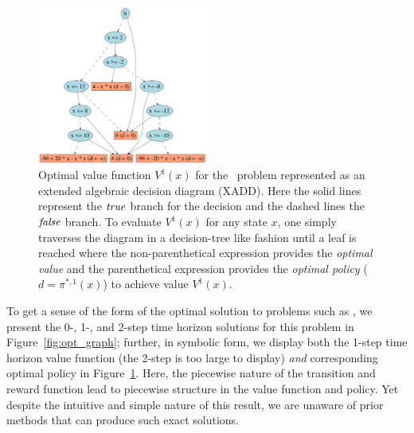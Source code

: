 \begin{figure}[t!]
\centering
\includegraphics[width=0.5\textwidth]{Figures1/v2_mr_dd.pdf}
\caption{\footnotesize Optimal value function $V^1(x)$ for the
\MarsRover\ problem represented as an extended algebraic decision
diagram (XADD).  Here the solid lines represent the $\mathit{true}$ branch for
the decision and the dashed lines the $\mathit{false}$ branch.  To evaluate
$V^1(x)$ for any state $x$, one simply traverses the diagram in a
decision-tree like fashion until a leaf is reached where the
non-parenthetical expression provides the \emph{optimal value} and the
parenthetical expression provides the \emph{optimal policy} 
($d = \pi^{*,1}(x)$) to achieve value $V^1(x)$.}
\label{fig:opt_val_pol}
\end{figure}

To get a sense of the form of the optimal solution to problems such as
\MarsRover, we present the 0-, 1-, and 2-step time horizon solutions
for this problem in Figure~\ref{fig:opt_graph}; further, in symbolic
form, we display both the 1-step time horizon value function (the
2-step is too large to display) \emph{and} corresponding optimal
policy in Figure~\ref{fig:opt_val_pol}.  Here, the piecewise nature of
the transition and reward function lead to piecewise
structure in the value function and policy.  Yet despite the intuitive and
simple nature of this result, we are unaware of prior methods that can
produce such exact solutions.

